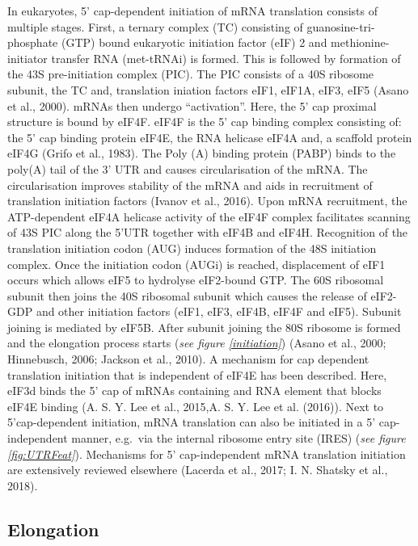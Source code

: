 \documentclass[12pt,openany]{book}
\begin{document}
In eukaryotes, 5' cap-dependent initiation of mRNA translation consists
of multiple stages. First, a ternary complex (TC) consisting of
guanosine-tri-phosphate (GTP) bound eukaryotic initiation factor (eIF) 2
and methionine-initiator transfer RNA (met-tRNAi) is formed. This is
followed by formation of the 43S pre-initiation complex (PIC). The PIC
consists of a 40S ribosome subunit, the TC and, translation iniation
factors eIF1, eIF1A, eIF3, eIF5 (Asano et al., 2000). mRNAs then undergo
``activation''. Here, the 5' cap proximal structure is bound by eIF4F.
eIF4F is the 5' cap binding complex consisting of: the 5' cap binding
protein eIF4E, the RNA helicase eIF4A and, a scaffold protein eIF4G
(Grifo et al., 1983). The Poly (A) binding protein (PABP) binds to the
poly(A) tail of the 3' UTR and causes circularisation of the mRNA. The
circularisation improves stability of the mRNA and aids in recruitment
of translation initiation factors (Ivanov et al., 2016). Upon mRNA
recruitment, the ATP-dependent eIF4A helicase activity of the eIF4F
complex facilitates scanning of 43S PIC along the 5'UTR together with
eIF4B and eIF4H. Recognition of the translation initiation codon (AUG)
induces formation of the 48S initiation complex. Once the initiation
codon (AUGi) is reached, displacement of eIF1 occurs which allows eIF5
to hydrolyse eIF2-bound GTP. The 60S ribosomal subunit then joins the
40S ribosomal subunit which causes the release of eIF2-GDP and other
initiation factors (eIF1, eIF3, eIF4B, eIF4F and eIF5). Subunit joining
is mediated by eIF5B. After subunit joining the 80S ribosome is formed
and the elongation process starts (\emph{see figure \ref{initiation}})
(Asano et al., 2000; Hinnebusch, 2006; Jackson et al., 2010). A
mechanism for cap dependent translation initiation that is independent
of eIF4E has been described. Here, eIF3d binds the 5' cap of mRNAs
containing and RNA element that blocks eIF4E binding (A. S. Y. Lee et
al., 2015,A. S. Y. Lee et al. (2016)). Next to 5'cap-dependent
initiation, mRNA translation can also be initiated in a 5'
cap-independent manner, e.g.~via the internal ribosome entry site (IRES)
(\emph{see figure \ref{fig:UTRFeat}}). Mechanisms for 5' cap-independent
mRNA translation initiation are extensively reviewed elsewhere (Lacerda
et al., 2017; I. N. Shatsky et al., 2018).

\subsection{Elongation} \label{elongation}
\end{document}
